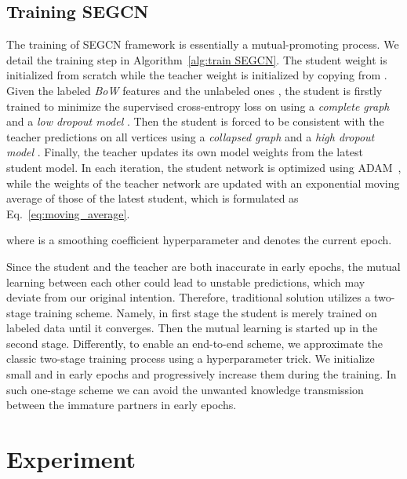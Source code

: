 \documentclass[letterpaper]{article} \usepackage{aaai19}  \usepackage{times}  \usepackage{helvet}  \usepackage{courier}  \usepackage{url}  \usepackage{graphicx}  \usepackage{algorithm}
\begin{document}
\subsection{Training SEGCN} \label{sec:training}
The training of SEGCN framework is essentially a mutual-promoting process. We detail the training step in Algorithm~\ref{alg:train SEGCN}. The student weight  is initialized from scratch while the teacher weight  is initialized by copying from . Given the labeled \emph{BoW} features  and the unlabeled ones , the student is firstly trained to minimize the supervised cross-entropy loss on  using a \emph{complete graph}  and a \emph{low dropout model} . Then the student is forced to be consistent with the teacher predictions on all vertices  using a \emph{collapsed graph}  and a \emph{high dropout model} . Finally, the teacher updates its own model weights from the latest student model. In each iteration, the student network is optimized using ADAM~\cite{kingma2014adam}, while the weights of the teacher network are updated with an exponential moving average of those of the latest student, which is formulated as Eq.~\ref{eq:moving_average}.
\newline

\newline
where  is a smoothing coefficient hyperparameter and  denotes the current epoch.

Since the student and the teacher are both inaccurate in early epochs, the mutual learning between each other could lead to unstable predictions, which may deviate from our original intention. Therefore, traditional solution utilizes a two-stage training scheme. Namely, in first stage the student is merely trained on labeled data until it converges. Then the mutual learning is started up in the second stage. Differently, to enable an end-to-end scheme, we approximate the classic two-stage training process using a hyperparameter trick. We initialize small  and  in early epochs and progressively increase them during the training. In such one-stage scheme we can avoid the unwanted knowledge transmission between the immature partners in early epochs.

\section{Experiment} \label{sec:experiment}
\end{document}
